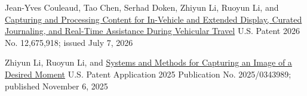 
\begin{cventries}
  \cventry
    {Jean-Yves Couleaud, Tao Chen, Serhad Doken, Zhiyun Li, Ruoyun Li, and \myname}
    {\href{https://patents.google.com/patent/US12675918B2/en}{Capturing and Processing Content for In-Vehicle and Extended Display, Curated Journaling, and Real-Time Assistance During Vehicular Travel}}
    {U.S. Patent}
    {2026}
    {No. 12,675,918; issued July 7, 2026}

  \cventry
    {Zhiyun Li, Ruoyun Li, and \myname}
    {\href{https://patents.google.com/patent/US20250343989A1/en}{Systems and Methods for Capturing an Image of a Desired Moment}}
    {U.S. Patent Application}
    {2025}
    {Publication No. 2025/0343989; published November 6, 2025}
\end{cventries}
